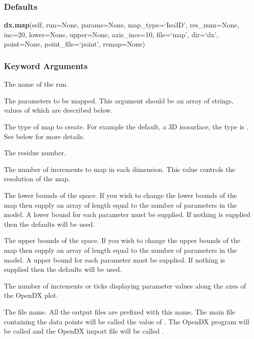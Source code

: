   
 \subsubsection{Defaults} 

 \textsf{\textbf{dx.map}(self, run=None, params=None, map\_type=`Iso3D', res\_num=None, inc=20, lower=None, upper=None, axis\_incs=10, file=`map', dir=`dx', point=None, point\_file=`point', remap=None)} 

  
 \subsubsection{Keyword Arguments} 

   The name of the run.   

   The parameters to be mapped.  This argument should be an array of strings, values of which are described below.   

   The type of map to create.  For example the default, a 3D isosurface, the type is .  See below for more details.   

   The residue number.   

   The number of increments to map in each dimension.  This value controls the resolution of the map.   

   The lower bounds of the space.  If you wish to change the lower bounds of the map then supply an array of length equal to the number of parameters in the model.  A lower bound for each parameter must be supplied.  If nothing is supplied then the defaults will be used.   

   The upper bounds of the space.  If you wish to change the upper bounds of the map then supply an array of length equal to the number of parameters in the model.  A upper bound for each parameter must be supplied.  If nothing is supplied then the defaults will be used.   

   The number of increments or ticks displaying parameter values along the axes of the OpenDX plot.   

   The file name.  All the output files are prefixed with this name.  The main file containing the data points will be called the value of .  The OpenDX program will be called  and the OpenDX import file will be called .   

